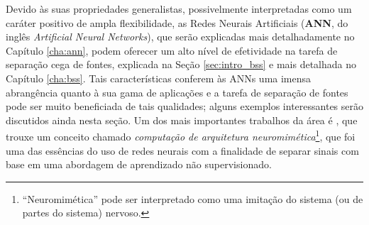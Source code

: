 Devido às suas propriedades generalistas, possivelmente interpretadas como um caráter positivo de ampla flexibilidade, as Redes Neurais Artificiais (\textbf{ANN}, do inglês \textit{Artificial Neural Networks}), que serão explicadas mais detalhadamente no Capítulo \ref{cha:ann}, podem oferecer um alto nível de efetividade na tarefa de separação cega de fontes, explicada na Seção \ref{sec:intro_bss} e mais detalhada no Capítulo \ref{cha:bss}. Tais características conferem às ANNs uma imensa abrangência quanto à sua gama de aplicações e a tarefa de separação de fontes pode ser muito beneficiada de tais qualidades; alguns exemplos interessantes serão discutidos ainda nesta seção. Um dos mais importantes trabalhos da área é \citep{herault1985detection}, que trouxe um conceito chamado \textit{computação de arquitetura neuromimética}\footnote{``Neuromimética'' pode ser interpretado como uma imitação do sistema (ou de partes do sistema) nervoso.}, que foi uma das essências do uso de redes neurais com a finalidade de separar sinais com base em uma abordagem de aprendizado não supervisionado.






